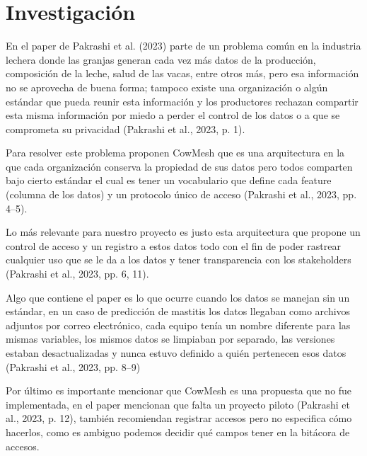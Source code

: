 \section{Investigación}

En el paper de Pakrashi et al. (2023) parte de un problema común en la industria lechera donde las granjas generan cada vez más datos de la producción, composición de la leche, salud de las vacas, entre otros más, pero esa información no se aprovecha de buena forma; tampoco existe una organización o algún estándar que pueda reunir esta información y los productores rechazan compartir esta misma información por miedo a perder el control de los datos o a que se comprometa su privacidad (Pakrashi et al., 2023, p. 1).

Para resolver este problema proponen CowMesh que es una arquitectura en la que cada organización conserva la propiedad de sus datos pero todos comparten bajo cierto estándar el cual es tener un vocabulario que define cada feature (columna de los datos) y un protocolo único de acceso (Pakrashi et al., 2023, pp. 4–5).

Lo más relevante para nuestro proyecto es justo esta arquitectura que propone un control de acceso y un registro a estos datos todo con el fin de poder rastrear cualquier uso que se le da a los datos y tener transparencia con los stakeholders (Pakrashi et al., 2023, pp. 6, 11).

Algo que contiene el paper es lo que ocurre cuando los datos se manejan sin un estándar, en un caso de predicción de mastitis los datos llegaban como archivos adjuntos por correo electrónico, cada equipo tenía un nombre diferente para las mismas variables, los mismos datos se limpiaban por separado, las versiones estaban desactualizadas y nunca estuvo definido a quién pertenecen esos datos (Pakrashi et al., 2023, pp. 8–9)

Por último es importante mencionar que CowMesh es una propuesta que no fue implementada, en el paper mencionan que falta un proyecto piloto (Pakrashi et al., 2023, p. 12), también recomiendan registrar accesos pero no especifica cómo hacerlos, como es ambiguo podemos decidir qué campos tener en la bitácora de accesos.

\nocite{pakrashi2023}
